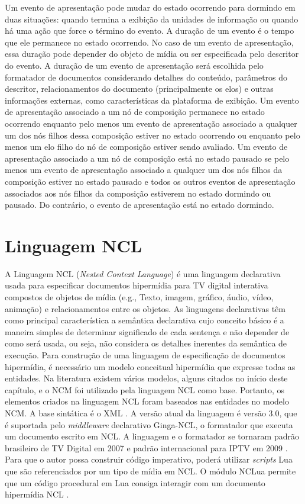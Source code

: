 Um evento de apresentação pode mudar do estado ocorrendo para dormindo em duas situações: quando termina a exibição da unidades de informação ou quando há uma ação que force o término do evento. A duração de um evento é o tempo que ele permanece no estado ocorrendo. No caso de um evento de apresentação, essa duração pode depender do objeto de mídia ou ser especificada pelo descritor do evento. A duração de um evento de apresentação será escolhida pelo formatador de documentos considerando detalhes do conteúdo, parâmetros do descritor, relacionamentos do documento (principalmente os elos) e outras informações externas, como características da plataforma de exibição. Um evento de apresentação associado a um nó de composição permanece no estado ocorrendo enquanto pelo menos um evento de apresentação associado a qualquer um dos nós filhos dessa composição estiver no estado ocorrendo ou enquanto pelo menos um elo filho do nó de composição estiver sendo avaliado. Um evento de apresentação associado a um nó de composição está no estado pausado se pelo menos um evento de apresentação associado a qualquer um dos nós filhos da composição estiver no estado pausado e todos os outros eventos de apresentação associados aos nós filhos da composição estiverem no estado dormindo ou pausado. Do contrário, o evento de apresentação está no estado dormindo. 

\section{Linguagem NCL}
\label{sec:LingNCL}

A Linguagem NCL (\textit{Nested Context Language}) \cite{soares2007ginga} é uma linguagem declarativa usada para especificar documentos hipermídia para TV digital interativa  compostos de objetos de mídia (e.g., Texto, imagem, gráfico, áudio, vídeo, animação) e relacionamentos entre os objetos. As linguagens declarativas têm como principal característica a semântica declarativa cujo conceito básico é a maneira simples de determinar significado de cada sentença e não depender de como será usada, ou seja, não considera os detalhes inerentes da semântica de execução. Para construção de uma linguagem de especificação de documentos hipermídia, é necessário um modelo conceitual hipermídia que expresse todas as entidades. Na literatura existem vários modelos, alguns citados no início deste capítulo, e o NCM foi utilizado pela linguagem NCL como base. Portanto, os elementos criados na linguagem NCL foram baseados nas entidades no modelo NCM. A base sintática é o XML \cite{W3C:2008aa}. A versão atual da linguagem é versão 3.0, que é suportada pelo \textit{middleware} declarativo Ginga-NCL, o formatador que executa um documento escrito em NCL. A linguagem e o formatador se tornaram padrão brasileiro de TV Digital em 2007 \cite{ABNT:2011aa} e padrão internacional para IPTV em 2009 \cite{ITU:2009ma}. Para que o autor possa construir código imperativo, poderá utilizar \textit{scripts} Lua \cite{ierusalimschy1996lua} que são referenciados por um tipo de mídia em NCL. O módulo NCLua permite que um código procedural em Lua consiga interagir com um documento hipermídia NCL \cite{sant2008nclua}.

